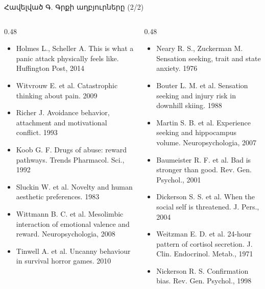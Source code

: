 \begin{frame}{Հավելված Գ. Գրքի աղբյուրները (2/2)}
  \scriptsize
  \begin{columns}[T]
    \begin{column}{0.48\textwidth}
      \begin{itemize}\setlength{\itemsep}{0.2mm}
        \item Holmes L., Scheller A. This is what a panic attack physically feels like. Huffington Post, 2014
        \item Witvrouw E. et al. Catastrophic thinking about pain. 2009
        \item Richer J. Avoidance behavior, attachment and motivational conflict. 1993
        \item Koob G. F. Drugs of abuse: reward pathways. Trends Pharmacol. Sci., 1992
        \item Sluckin W. et al. Novelty and human aesthetic preferences. 1983
        \item Wittmann B. C. et al. Mesolimbic interaction of emotional valence and reward. Neuropsychologia, 2008
        \item Tinwell A. et al. Uncanny behaviour in survival horror games. 2010
      \end{itemize}
    \end{column}
    \begin{column}{0.48\textwidth}
      \begin{itemize}\setlength{\itemsep}{0.2mm}
        \item Neary R. S., Zuckerman M. Sensation seeking, trait and state anxiety. 1976
        \item Bouter L. M. et al. Sensation seeking and injury risk in downhill skiing. 1988
        \item Martin S. B. et al. Experience seeking and hippocampus volume. Neuropsychologia, 2007
        \item Baumeister R. F. et al. Bad is stronger than good. Rev. Gen. Psychol., 2001
        \item Dickerson S. S. et al. When the social self is threatened. J. Pers., 2004
        \item Weitzman E. D. et al. 24-hour pattern of cortisol secretion. J. Clin. Endocrinol. Metab., 1971
        \item Nickerson R. S. Confirmation bias. Rev. Gen. Psychol., 1998
      \end{itemize}
    \end{column}
  \end{columns}
\end{frame}
